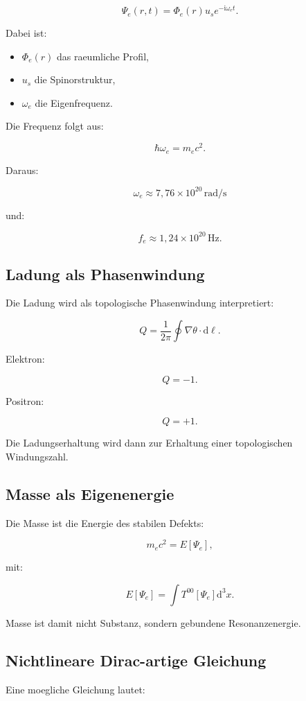 \documentclass[11pt,a4paper]{article}
\newcommand{\dd}{\mathrm{d}}
\newcommand{\ii}{\mathrm{i}}
\begin{document}
\[
\Psi_e(r,t)=\Phi_e(r)u_s e^{-\ii\omega_e t}.
\]

Dabei ist:
\begin{itemize}
  \item $\Phi_e(r)$ das raeumliche Profil,
  \item $u_s$ die Spinorstruktur,
  \item $\omega_e$ die Eigenfrequenz.
\end{itemize}

Die Frequenz folgt aus:

\[
\hbar\omega_e = m_ec^2.
\]

Daraus:

\[
\omega_e \approx 7{,}76\times 10^{20}\,\mathrm{rad/s}
\]

und:

\[
f_e \approx 1{,}24\times 10^{20}\,\mathrm{Hz}.
\]

\subsection{Ladung als Phasenwindung}

Die Ladung wird als topologische Phasenwindung interpretiert:

\[
Q=\frac{1}{2\pi}\oint \nabla\theta\cdot \dd \ell.
\]

Elektron:

\[
Q=-1.
\]

Positron:

\[
Q=+1.
\]

Die Ladungserhaltung wird dann zur Erhaltung einer topologischen Windungszahl.

\subsection{Masse als Eigenenergie}

Die Masse ist die Energie des stabilen Defekts:

\[
m_ec^2 = E[\Psi_e],
\]

mit:

\[
E[\Psi_e]=\int T^{00}[\Psi_e] \dd^3x.
\]

Masse ist damit nicht Substanz, sondern gebundene Resonanzenergie.

\subsection{Nichtlineare Dirac-artige Gleichung}

Eine moegliche Gleichung lautet:
\end{document}
